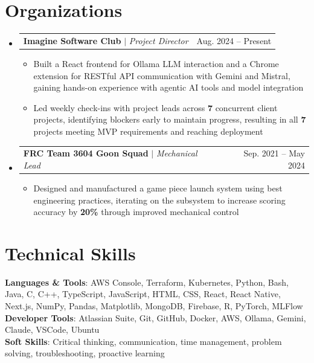 \documentclass[letterpaper,11pt]{article}
\makeatletter
\newcommand{\resumeItem}[1]{
  \item\small{
    {#1 \vspace{-4pt}}
  }
}
\newcommand{\resumeProjectHeading}[2]{
    \item
    \begin{tabular*}{0.97\textwidth}{l@{\extracolsep{\fill}}r}
      \small#1 & #2 \\
    \end{tabular*}\vspace{-7pt}
}
\newcommand{\resumeSubHeadingListStart}{\begin{itemize}[leftmargin=0.15in, label={}]}
\newcommand{\resumeSubHeadingListEnd}{\end{itemize}}
\newcommand{\resumeItemListStart}{\begin{itemize}}
\newcommand{\resumeItemListEnd}{\end{itemize}\vspace{-5pt}}
\makeatother
\begin{document}
\section{Organizations}
  \resumeSubHeadingListStart
  
    \resumeProjectHeading
      {\textbf{Imagine Software Club} $|$ \emph{Project Director}}{Aug. 2024 -- Present}
      \resumeItemListStart
        \resumeItem{Built a React frontend for Ollama LLM interaction and a Chrome extension for RESTful API communication with Gemini and Mistral, gaining hands-on experience with agentic AI tools and model integration}
        \resumeItem{Led weekly check-ins with project leads across \textbf{7} concurrent client projects, identifying blockers early to maintain progress, resulting in all \textbf{7} projects meeting MVP requirements and reaching deployment}
      \resumeItemListEnd

    \resumeProjectHeading
      {\textbf{FRC Team 3604 Goon Squad} $|$ \emph{Mechanical Lead}}{Sep. 2021 -- May 2024}
      \resumeItemListStart
        \resumeItem{Designed and manufactured a game piece launch system using best engineering practices, iterating on the subsystem to increase scoring accuracy by \textbf{20\%} through improved mechanical control}
      \resumeItemListEnd

 \resumeSubHeadingListEnd
 
%
\section{Technical Skills}
 \begin{itemize}[leftmargin=0.15in, label={}]
    \small{\item{
     \textbf{Languages \& Tools}{: AWS Console, Terraform, Kubernetes, Python, Bash, Java, C, C++, TypeScript, JavaScript, HTML, CSS, React, React Native, Next.js, NumPy, Pandas, Matplotlib, MongoDB, Firebase, R, PyTorch, MLFlow} \\
     \textbf{Developer Tools}{: Atlassian Suite, Git, GitHub, Docker, AWS, Ollama, Gemini, Claude, VSCode, Ubuntu} \\
     \textbf{Soft Skills}{: Critical thinking, communication, time management, problem solving, troubleshooting, proactive learning} \\
    }}
 \end{itemize}


\end{document}
